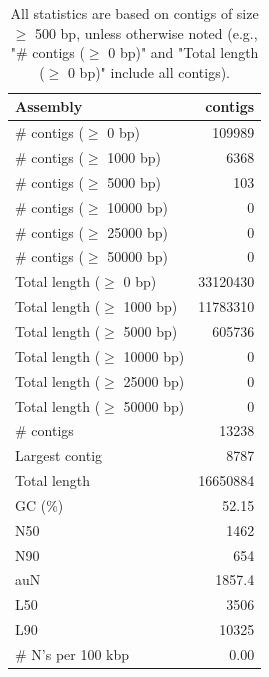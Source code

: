 \documentclass[12pt,a4paper]{article}
\begin{document}
\begin{table}[ht]
\begin{center}
\caption{All statistics are based on contigs of size $\geq$ 500 bp, unless otherwise noted (e.g., "\# contigs ($\geq$ 0 bp)" and "Total length ($\geq$ 0 bp)" include all contigs).}
\begin{tabular}{|l*{1}{|r}|}
\hline
Assembly & contigs \\ \hline
\# contigs ($\geq$ 0 bp) & 109989 \\ \hline
\# contigs ($\geq$ 1000 bp) & 6368 \\ \hline
\# contigs ($\geq$ 5000 bp) & 103 \\ \hline
\# contigs ($\geq$ 10000 bp) & 0 \\ \hline
\# contigs ($\geq$ 25000 bp) & 0 \\ \hline
\# contigs ($\geq$ 50000 bp) & 0 \\ \hline
Total length ($\geq$ 0 bp) & 33120430 \\ \hline
Total length ($\geq$ 1000 bp) & 11783310 \\ \hline
Total length ($\geq$ 5000 bp) & 605736 \\ \hline
Total length ($\geq$ 10000 bp) & 0 \\ \hline
Total length ($\geq$ 25000 bp) & 0 \\ \hline
Total length ($\geq$ 50000 bp) & 0 \\ \hline
\# contigs & 13238 \\ \hline
Largest contig & 8787 \\ \hline
Total length & 16650884 \\ \hline
GC (\%) & 52.15 \\ \hline
N50 & 1462 \\ \hline
N90 & 654 \\ \hline
auN & 1857.4 \\ \hline
L50 & 3506 \\ \hline
L90 & 10325 \\ \hline
\# N's per 100 kbp & 0.00 \\ \hline
\end{tabular}
\end{center}
\end{table}
\end{document}
